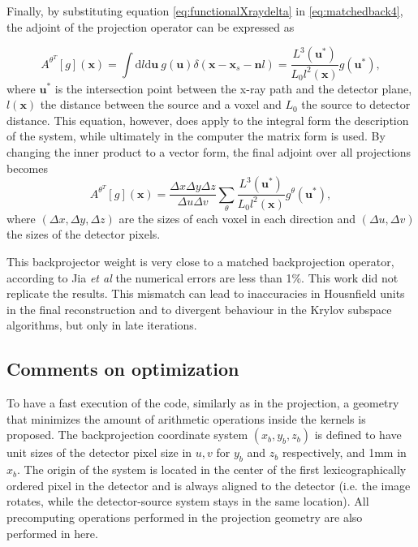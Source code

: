Finally, by substituting equation \ref{eq:functionalXraydelta} in \ref{eq:matchedback4}, the adjoint of the projection operator can be expressed as

\begin{equation}
A^{\theta^T}[g](\textbf{x})=\int\mathrm{d}l\mathrm{d}\textbf{u} \ g(\textbf{u})\delta(\textbf{x}-\textbf{x}_s-\textbf{n}l)=\frac{L^3(\textbf{u}^*)}{L_0l^2(\textbf{x})}g(\textbf{u}^*),
\end{equation}
where $\textbf{u}^*$ is the intersection point between the x-ray path and the detector plane, $l(\textbf{x})$ the distance between the source and a voxel and $L_0$ the source to detector distance. This equation, however, does apply to the integral form the description of the system, while ultimately in the computer the matrix form is used. By changing the inner product to a vector form, the final adjoint over all projections becomes
\begin{equation}
A^{\theta^T}[g](\textbf{x})=\frac{\Delta x \Delta y \Delta z}{\Delta u \Delta v}\sum_\theta\frac{L^3(\textbf{u}^*)}{L_0l^2(\textbf{x})}g^\theta(\textbf{u}^*),\label{eq:finalmatched}
\end{equation}
where $(\Delta x,\Delta y,\Delta z)$ are the sizes of each voxel in each direction and $(\Delta u,\Delta v)$ the sizes of the detector pixels. 

This backprojector weight is very close to a matched backprojection operator, according to Jia \textit{et al} the numerical errors are less than 1\%. This work did not replicate the results. This mismatch can lead to inaccuracies in Housnfield units in the final reconstruction and to divergent behaviour in the Krylov subspace algorithms, but only in late iterations.

\subsection{Comments on optimization}

To have a fast execution of the code, similarly as in the projection, a geometry that minimizes the amount of arithmetic operations inside the kernels is proposed. The backprojection coordinate system $(x_b,y_b,z_b)$ is defined to have unit sizes of the detector pixel size in $u,v$ for $y_b$ and $z_b$ respectively, and 1mm in $x_b$. The origin of the system is located in the center of the first lexicographically ordered pixel in the detector and is always aligned to the detector (i.e. the image rotates, while the detector-source system stays in the same location).  All precomputing operations performed in the projection geometry are also performed in here.

